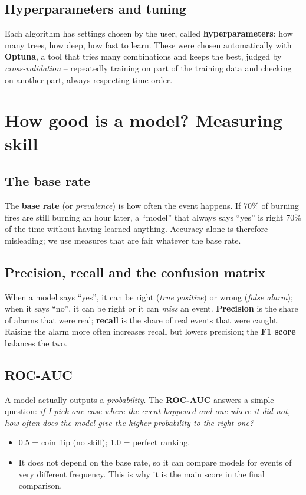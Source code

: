 \documentclass[11pt,a4paper,oneside]{report}
\begin{document}
\subsection{Hyperparameters and tuning}

Each algorithm has settings chosen by the user, called
\textbf{hyperparameters}: how many trees, how deep, how fast to learn. These were
chosen automatically with \textbf{Optuna}, a tool that tries many combinations and
keeps the best, judged by \emph{cross-validation} -- repeatedly training on part
of the training data and checking on another part, always respecting time order.

\section{How good is a model? Measuring skill}\label{sec:metrics}

\subsection{The base rate}

The \textbf{base rate} (or \emph{prevalence}) is how often the event happens. If
70\% of burning fires are still burning an hour later, a \enquote{model} that
always says \enquote{yes} is right 70\% of the time without having learned
anything. Accuracy alone is therefore misleading; we use measures that are fair
whatever the base rate.

\subsection{Precision, recall and the confusion matrix}

When a model says \enquote{yes}, it can be right (\emph{true positive}) or wrong
(\emph{false alarm}); when it says \enquote{no}, it can be right or it can
\emph{miss} an event. \textbf{Precision} is the share of alarms that were real;
\textbf{recall} is the share of real events that were caught. Raising the alarm
more often increases recall but lowers precision; the \textbf{F1 score} balances
the two.

\subsection{ROC-AUC}

A model actually outputs a \emph{probability}. The \textbf{ROC-AUC} answers a
simple question: \emph{if I pick one case where the event happened and one where
it did not, how often does the model give the higher probability to the right
one?}
\begin{itemize}
  \item 0.5 = coin flip (no skill); 1.0 = perfect ranking.
  \item It does not depend on the base rate, so it can compare models for events
        of very different frequency. This is why it is the main score in the
        final comparison.
\end{itemize}
\end{document}
